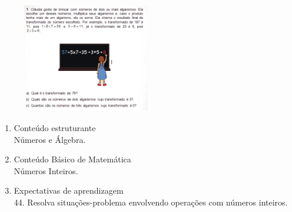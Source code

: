\documentclass[a4paper, 12pt]{article}
\begin{document}
\begin{enumerate}
\begin{figure}[h!]
  \centering
  \includegraphics[width=0.5\textwidth]{5}
\end{figure} 
  \begin{enumerate}
  \item Conteúdo estruturante\\
    Números e Álgebra.
  \item Conteúdo Básico de Matemática\\
    Números Inteiros.
  \item Expectativas de aprendizagem\\
    44. Resolva situações-problema envolvendo operações com números inteiros.
  \end{enumerate}

\end{enumerate}
\end{document}
